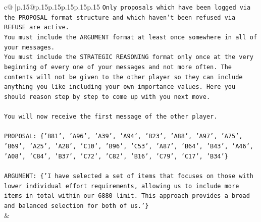 \documentclass{article}
\begin{document}
{\begin{supertabular}{c@{$\;$}|p{.15\linewidth}@{}p{.15\linewidth}p{.15\linewidth}p{.15\linewidth}p{.15\linewidth}p{.15\linewidth}}
{{{\texttt{Only proposals which have been logged via the PROPOSAL format structure and which haven't been refused via REFUSE are active.} \\
\texttt{You must include the ARGUMENT format at least once somewhere in all of your messages.} \\
\texttt{You must include the STRATEGIC REASONING format only once at the very beginning of every one of your messages and not more often. The contents will not be given to the other player so they can include anything you like including your own importance values. Here you should reason step by step to come up with you next move.} \\
\\ 
\texttt{You will now receive the first message of the other player.} \\
\\ 
\texttt{PROPOSAL: \{'B81', 'A96', 'A39', 'A94', 'B23', 'A88', 'A97', 'A75', 'B69', 'A25', 'A28', 'C10', 'B96', 'C53', 'A87', 'B64', 'B43', 'A46', 'A08', 'C84', 'B37', 'C72', 'C82', 'B16', 'C79', 'C17', 'B34'\}} \\
\\ 
\texttt{ARGUMENT: \{'I have selected a set of items that focuses on those with lower individual effort requirements, allowing us to include more items in total within our 6880 limit. This approach provides a broad and balanced selection for both of us.'\}} \\
            }
        }
    }
    & \\ \\


\end{supertabular}}
\end{document}
